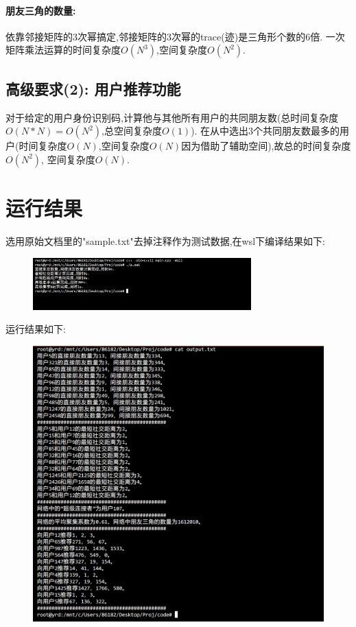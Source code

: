 \documentclass{article}
\begin{document}
\begin{CJK*}{UTF8}{gbsn}
\paragraph{朋友三角的数量: }依靠邻接矩阵的3次幂搞定,邻接矩阵的3次幂的trace(迹)是三角形个数的6倍.
一次矩阵乘法运算的时间复杂度$O(N^3)$,空间复杂度$O(N^2)$.
\subsection{高级要求(2): 用户推荐功能}
\par 对于给定的用户身份识别码,计算他与其他所有用户的共同朋友数(总时间复杂度$O(N*N)=O(N^2)$,总空间复杂度$O(1)$).
在从中选出3个共同朋友数最多的用户(时间复杂度$O(N)$,空间复杂度$O(N)$因为借助了辅助空间),故总的时间复杂度$O(N^2)$,
空间复杂度$O(N)$.

\section{运行结果}
\par 选用原始文档里的"sample.txt"去掉注释作为测试数据,在wsl下编译结果如下:
\begin{figure}[H]
    \centering
    \includegraphics[width=0.75\textwidth]{compile.png}
\end{figure}
\par 运行结果如下:
\begin{figure}[H]
    \centering
    \includegraphics[width=1.0\textwidth]{run.png}
\end{figure}


\end{CJK*}
\end{document}
